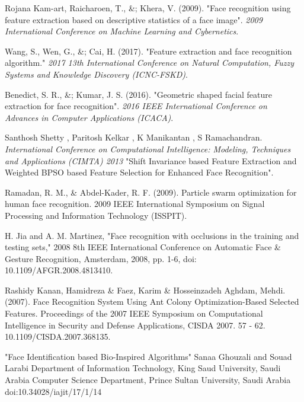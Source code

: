 \documentclass[a4paper,12pt]{report}
\begin{document}
\begin{thebibliography}{15}

 Rojana Kam-art, Raicharoen, T., \&; Khera, V. (2009). "Face recognition using feature extraction based on descriptive statistics of a face image". \textit{2009 International Conference on Machine Learning and Cybernetics}.

Wang, S., Wen, G., \&; Cai, H. (2017). "Feature extraction and face recognition algorithm." \textit{2017 13th  International Conference on Natural Computation, Fuzzy Systems and Knowledge Discovery (ICNC-FSKD)}.

Benedict, S. R., \&; Kumar, J. S. (2016). "Geometric shaped facial feature extraction for face recognition". \textit{2016 IEEE International Conference on Advances in Computer Applications (ICACA)}.

Santhosh Shetty , Paritosh Kelkar , K Manikantan , S Ramachandran. \textit{International Conference on Computational Intelligence: Modeling, Techniques and Applications (CIMTA) 2013} "Shift Invariance based Feature Extraction and Weighted BPSO based Feature Selection for Enhanced Face Recognition".

Ramadan, R. M., \& Abdel-Kader, R. F. (2009). Particle swarm optimization for human face recognition. 2009 IEEE International Symposium on Signal Processing and Information Technology (ISSPIT).

H. Jia and A. M. Martinez, "Face recognition with occlusions in the training and testing sets," 2008 8th IEEE International Conference on Automatic Face \& Gesture Recognition, Amsterdam, 2008, pp. 1-6, doi: 10.1109/AFGR.2008.4813410.

Rashidy Kanan, Hamidreza \& Faez, Karim \& Hosseinzadeh Aghdam, Mehdi. (2007). Face Recognition System Using Ant Colony Optimization-Based Selected Features. Proceedings of the 2007 IEEE Symposium on Computational Intelligence in Security and Defense Applications, CISDA 2007. 57 - 62. 10.1109/CISDA.2007.368135. 

"Face Identification based Bio-Inspired Algorithms"
Sanaa Ghouzali and Souad Larabi 
Department of Information Technology, King Saud University, Saudi Arabia
Computer Science Department, Prince Sultan University, Saudi Arabia doi:10.34028/iajit/17/1/14
\end{thebibliography}
\pagebreak 
\end{document}
